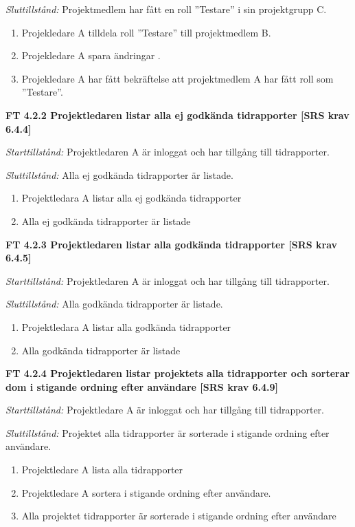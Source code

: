 \documentclass[a4paper]{article}
\begin{document}
\emph{Sluttillstånd:} Projektmedlem har fått en roll ”Testare” i sin projektgrupp C.

\begin{enumerate}
\item Projekledare A tilldela roll ”Testare” till projektmedlem B.
\item Projekledare A spara ändringar .
\item Projekledare A har fått bekräftelse att projektmedlem A har fått roll som ”Testare”.
\end{enumerate}


\textbf{ FT 4.2.2 Projektledaren listar alla ej godkända tidrapporter [SRS krav 6.4.4]}

\emph{Starttillstånd:} Projektledaren A är inloggat och har tillgång till tidrapporter.

\emph{Sluttillstånd:} Alla ej godkända tidrapporter är listade.                          

\begin{enumerate}
\item Projektledara A listar alla ej godkända tidrapporter
\item Alla ej godkända tidrapporter är listade
\end{enumerate}

\textbf{FT 4.2.3 Projektledaren listar alla godkända tidrapporter [SRS krav 6.4.5]}

\emph{Starttillstånd:} Projektledaren A är inloggat och har tillgång till tidrapporter.

\emph{Sluttillstånd:} Alla godkända tidrapporter är listade.

\begin{enumerate}
\item Projektledara A listar alla godkända tidrapporter
\item Alla godkända tidrapporter är listade
\end{enumerate}


\textbf{FT 4.2.4 Projektledaren listar projektets alla tidrapporter och sorterar dom i stigande ordning efter användare [SRS krav 6.4.9]}

\emph{Starttillstånd:} Projektledare A är inloggat och har tillgång till tidrapporter.

\emph{Sluttillstånd:} Projektet alla tidrapporter är sorterade i stigande ordning efter användare.

\begin{enumerate}
\item Projektledare A lista alla tidrapporter
\item Projektledare A sortera i stigande ordning efter användare.
\item Alla projektet tidrapporter är sorterade i stigande ordning efter användare
\end{enumerate}
\end{document}
